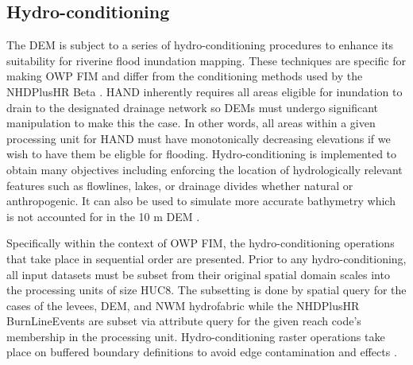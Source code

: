 \subsection{Hydro-conditioning}
\label{ssec:hydro_conditioning}
%
The DEM is subject to a series of hydro-conditioning procedures to enhance its suitability for riverine flood inundation mapping. 
These techniques are specific for making OWP FIM and differ from the conditioning methods used by the NHDPlusHR Beta \cite{moore2019user}.
HAND inherently requires all areas eligible for inundation to drain to the designated drainage network so DEMs must undergo significant manipulation to make this the case.
In other words, all areas within a given processing unit for HAND must have monotonically decreasing elevations if we wish to have them be eligble for flooding.
Hydro-conditioning is implemented to obtain many objectives including enforcing the location of hydrologically relevant features such as flowlines, lakes, or drainage divides whether natural or anthropogenic. 
It can also be used to simulate more accurate bathymetry which is not accounted for in the 10 m DEM \cite{gesch2002national}.

Specifically within the context of OWP FIM, the hydro-conditioning operations that take place in sequential order are presented. 
Prior to any hydro-conditioning, all input datasets must be subset from their original spatial domain scales into the processing units of size HUC8. 
The subsetting is done by spatial query for the cases of the levees, DEM, and NWM hydrofabric while the NHDPlusHR BurnLineEvents are subset via attribute query for the given reach code's membership in the processing unit.
Hydro-conditioning raster operations take place on buffered boundary definitions to avoid edge contamination and effects \cite{lindsay2013measuring}. 
%
